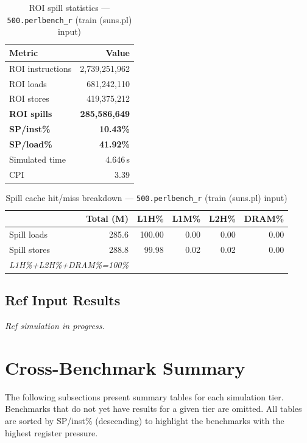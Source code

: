 \documentclass[11pt,a4paper]{article}
\begin{document}
\begin{table}[H]
\centering
\caption{ROI spill statistics --- \texttt{500.perlbench\_r} (train (suns.pl) input)}
\label{tab:perl_suns_train (suns.pl)_roi}
\begin{tabular}{lr}
\toprule
\textbf{Metric} & \textbf{Value} \\
\midrule
ROI instructions & 2,739,251,962 \\
ROI loads        & 681,242,110 \\
ROI stores       & 419,375,212 \\
\textbf{ROI spills}   & \textbf{285,586,649} \\
\textbf{SP/inst\%}   & \textbf{10.43\%} \\
\textbf{SP/load\%}   & \textbf{41.92\%} \\
Simulated time   & 4.646\,s \\
CPI              & 3.39 \\
\bottomrule
\end{tabular}
\end{table}

\begin{table}[H]
\centering
\caption{Spill cache hit/miss breakdown --- \texttt{500.perlbench\_r} (train (suns.pl) input)}
\label{tab:perl_suns_train (suns.pl)_cache}
\begin{tabular}{lrrrrr}
\toprule
\textbf{} & \textbf{Total (M)} & \textbf{L1H\%} & \textbf{L1M\%} & \textbf{L2H\%} & \textbf{DRAM\%} \\
\midrule
Spill loads  & 285.6 & 100.00 & 0.00 & 0.00 & 0.00 \\
Spill stores & 288.8 & 99.98 & 0.02 & 0.02 & 0.00 \\
\multicolumn{2}{l}{\small\textit{L1H\%+L2H\%+DRAM\%=100\%}} \\
\bottomrule
\end{tabular}
\end{table}

\subsection{Ref Input Results}
\textit{Ref simulation in progress.}



\clearpage
\section{Cross-Benchmark Summary}
\label{sec:summary}

The following subsections present summary tables for each simulation tier.
Benchmarks that do not yet have results for a given tier are omitted.
All tables are sorted by SP/inst\% (descending) to highlight the
benchmarks with the highest register pressure.
\end{document}
